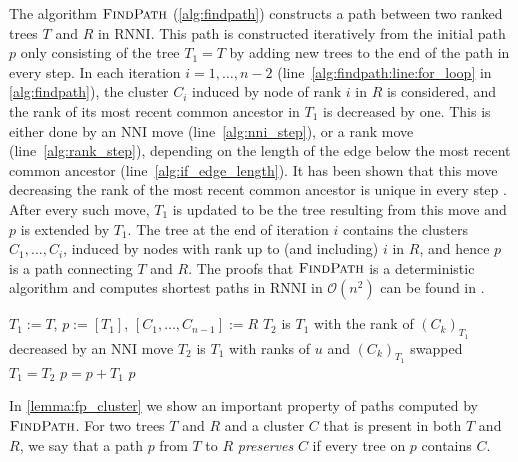\documentclass[11pt]{amsart}
\newcommand{\rnni}{\mathrm{RNNI}}
\newcommand{\findpath}{\textsc{FindPath}}
\newcommand{\rank}{\mathrm{rank}}
\newcommand{\nni}{\mathrm{NNI}}
\newcommand{\fp}{\mathrm{FP}}
\renewcommand{\O}{\mathcal O}
\newcommand{\summary}[1]{} %
\providecommand{\DIFaddtex}[1]{{\protect\color{blue}\uwave{#1}}} %
\providecommand{\DIFaddbegin}{} %
\providecommand{\DIFaddend}{} %
\providecommand{\DIFadd}[1]{\texorpdfstring{\DIFaddtex{#1}}{#1}} %
\newcommand{\DIFaddincludegraphics}[2][]{{\color{blue}\fbox{\DIFOincludegraphics[#1]{#2}}}} %
\DeclareRobustCommand{\DIFaddbegin}{\DIFOaddbegin \let\includegraphics\DIFaddincludegraphics} %
\DeclareRobustCommand{\DIFaddend}{\DIFOaddend \let\includegraphics\DIFOincludegraphics} %
\begin{document}
\summary{Explain $\findpath$ in $\rnni$}
The algorithm $\findpath$ (\autoref{alg:findpath}) constructs a path between two ranked trees $T$ and $R$ in $\rnni$\DIFaddbegin \DIFadd{, which we denote by $\fp(T,R)$}\DIFaddend .
This path is constructed iteratively from the initial path $p$ only consisting of the tree $T_1 = T$ by adding new trees to the end of the path in every step.
In each iteration $i = 1, \ldots, n-2$ (line~\ref{alg:findpath:line:for_loop} in \autoref{alg:findpath}), the cluster $C_i$ induced by node of rank $i$ in $R$ is considered, and the rank of its most recent common ancestor in $T_1$ is decreased by one.
This is either done by an $\nni$ move (line~\ref{alg:nni_step}), or a rank move (line~\ref{alg:rank_step}), depending on the length of the edge below the most recent common ancestor (line~\ref{alg:if_edge_length}).
It has been shown that this move decreasing the rank of the most recent common ancestor is unique in every step \autocite[Proposition 1]{Collienne2021}.
After every such move, $T_1$ is updated to be the tree resulting from this move and $p$ is extended by $T_1$.
The tree at the end of iteration $i$ contains the clusters $C_1, \ldots, C_i$, induced by nodes with rank up to (and including) $i$ in $R$, and hence $p$ is a path connecting $T$ and $R$.
The proofs that $\findpath$ is a deterministic algorithm and computes shortest paths in $\rnni$ in $\O(n^2)$ can be found in \autocite{Collienne2021}.

\begin{algorithm}[ht]
	\caption{$\findpath$($T,R$)}
	\label{alg:findpath}
	\begin{algorithmic}[1]
	\STATE $T_1 := T$, $p := [T_1]$, $[C_1, \ldots, C_{n-1}] := R$
	\label{alg:findpath:line:for_loop}
		\WHILE {$\rank((C_k)_{T_1})>k$}
		\label{alg:findpath:line:while_loop}
				\label{alg:if_edge_length}
				\STATE $T_2$ is $T_1$ with the rank of $(C_k)_{T_1}$ decreased by an $\nni$ move
				\label{alg:nni_step}
			\ELSE
				\STATE $T_2$ is $T_1$ with ranks of $u$ and $(C_k)_{T_1}$ swapped
				\label{alg:rank_step}
			\ENDIF
			\STATE $T_1 = T_2$
			\STATE $p = p+T_1$
		\ENDWHILE
	\ENDFOR
	\RETURN $p$
	\end{algorithmic}
\end{algorithm}

In \autoref{lemma:fp_cluster} we show an important property of paths computed by $\findpath$.
For two trees $T$ and $R$ and a cluster $C$ that is present in both $T$ and $R$, we say that a path $p$ from $T$ to $R$ \emph{preserves} $C$ if every tree on $p$ contains $C$.
\end{document}
